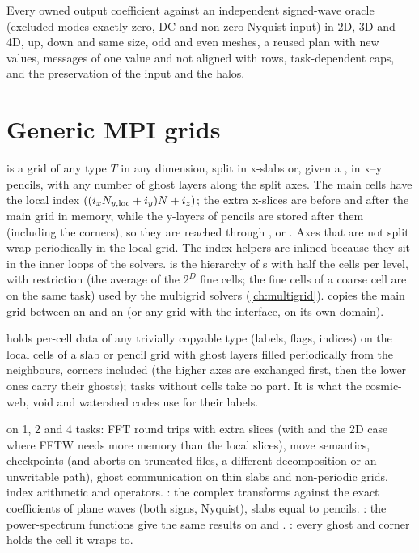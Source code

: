 \begin{validation}
Every owned output coefficient against an independent signed-wave oracle (excluded modes exactly zero, DC and non-zero Nyquist
input) in 2D, 3D and 4D, up, down and same size, odd and even meshes, a reused plan with new values, messages of one value and
not aligned with rows, task-dependent caps, and the preservation of the input and the halos.
\end{validation}

\section{Generic MPI grids}\label{sec:grids-mpigrid}

 is a grid of any type $T$ in any dimension, split in x-slabs or, given a , in x--y pencils, with any
number of ghost layers along the split axes. The main cells have the local index $((i_x N_{y,\rm loc}+i_y)N+i_z)$; the extra
x-slices are before and after the main grid in memory, while the y-layers of pencils are stored after them (including the
corners), so they are reached through ,  or .
Axes that are not split wrap periodically in the local grid. The index helpers are inlined because they sit in the inner loops of
the solvers.  is the hierarchy of s with half the cells per level, with restriction (the average of
the $2^D$ fine cells; the fine cells of a coarse cell are on the same task) used by the multigrid solvers (\cref{ch:multigrid}).
 copies the main grid between an  and an  (or any grid with the
interface, on its own domain).

 holds per-cell data of any trivially copyable type (labels, flags, indices) on the local cells of a slab or
pencil grid with ghost layers filled periodically from the neighbours, corners included (the higher axes are exchanged first, then
the lower ones carry their ghosts); tasks without cells take no part. It is what the cosmic-web, void and watershed codes use for
their labels.

\begin{validation}
 on 1, 2 and 4 tasks: FFT round trips with extra slices (with  and the 2D case
where FFTW needs more memory than the local slices), move semantics, checkpoints (and aborts on truncated files, a different
decomposition or an unwritable path), ghost communication on thin slabs and non-periodic grids, index arithmetic and operators.
: the complex transforms against the exact coefficients of plane waves (both signs, Nyquist),
slabs equal to pencils. : the power-spectrum functions give the same results on
 and . : every ghost and corner holds the cell it wraps to.
\end{validation}
